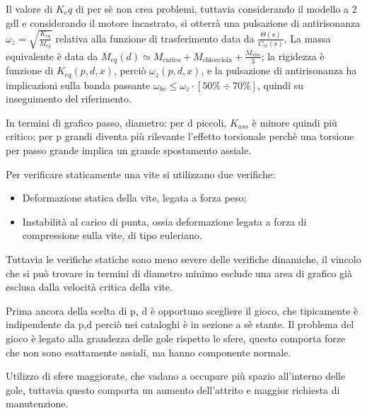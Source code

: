 
Il valore di \(K_eq\) di per sè non crea problemi, tuttavia considerando il modello a 2 gdl e considerando il motore incastrato, si otterrà una pulsazione di antirisonanza \(\omega_z = \sqrt{\frac{K_{eq}}{M_{eq}}}\) relativa alla funzione di trasferimento data da \( \frac{\Theta(s)}{C_m(s)} \).
La massa equivalente è data da \( M_{eq}(d) \simeq M_\text{carico} + M_\text{chiocciola} + \frac{M_\text{vite}}{3} \); la rigidezza è funzione di \( K_{eq}(p,d,x) \), perciò \(\omega_z (p,d,x)\), e la pulsazione di antirisonanza ha implicazioni sulla banda passante \( \omega_{bv} \leqslant \omega_z \cdot [50\% \div 70\%] \), quindi su inseguimento del riferimento.

In termini di grafico passo, diametro: per d piccoli, \( K_{ass} \) è minore quindi più critico; per p grandi diventa più rilevante l'effetto torsionale perchè una torsione per passo grande implica un grande spostamento assiale.

Per verificare staticamente una vite si utilizzano due verifiche:
\begin{itemize}
    \item Deformazione statica della vite, legata a forza peso;
    \item Instabilità al carico di punta, ossia deformazione legata a forza di compressione sulla vite, di tipo euleriano.
\end{itemize}
Tuttavia le verifiche statiche sono meno severe delle verifiche dinamiche, il vincolo che si può trovare in termini di diametro minimo esclude una area di grafico già esclusa dalla velocità critica della vite.



Prima ancora della scelta di p, d è opportuno scegliere il gioco, che tipicamente è indipendente da p,d perciò nei cataloghi è in sezione a sè stante.
Il problema del gioco è legato alla grandezza delle gole rispetto le sfere, questo comporta forze che non sono esattamente assiali, ma hanno componente normale.

Utilizzo di sfere maggiorate, che vadano a occupare più spazio all'interno delle gole, tuttavia questo comporta un aumento dell'attrito e maggior richiesta di manutenzione.

